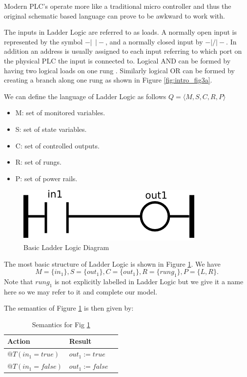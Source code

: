 Modern PLC's operate more like a traditional micro controller and thus the 
original schematic based language can prove to be awkward to work with.

The inputs in Ladder Logic are referred to as loads. A normally open input
is represented by the 
symbol $-\vert ~ ~ \vert-$, and a normally closed input by $-\vert/\vert-$.
In addition an address is usually assigned to each input referring to 
which port on the physical PLC the input is connected to. Logical AND 
can be formed by having two logical loads on one rung \cite{ebookmorris}. 
Similarly logical OR can be formed by creating a branch along one 
rung as shown in Figure \ref{fig:intro_fig3a}.

We can define the language of Ladder Logic as follows $Q = \langle M,S,C,R,P \rangle $

\begin{itemize}
	\item M: set of monitored variables.
	\item S: set of state variables.
	\item C: set of controlled outputs.
	\item R: set of rungs.
	\item P: set of power rails.
\end{itemize}

\begin{figure}[htp]
    \centering
    \includegraphics[width=\imgsmall]{./images/intro_fig1.png}
    \caption{Basic Ladder Logic Diagram}
    \label{fig:intro_fig1}
\end{figure}

The most basic structure of Ladder Logic is shown in Figure \ref{fig:intro_fig1}. 
We have 
$$M=\lbrace in_1 \rbrace, S=\lbrace out_1 \rbrace, C=\lbrace out_1 \rbrace, R=\lbrace rung_1 \rbrace, P=\lbrace L,R \rbrace.$$
Note that $rung_1$ is not explicitly labelled in Ladder Logic but we give it a name here
so we may refer to it and complete our model.

\clearpage
The semantics of Figure \ref{fig:intro_fig1} is then given by: 
\begin{table}[h]
    \centering
    \begin{tabular}{|l|l|l|}
        \hline
        Action & Result \\
        \hline
        $@T(in_1 = true)$ & $out_1 := true$ \\
        \hline
        $@T(in_1 = false)$ & $out_1 := false$ \\
        \hline
    \end{tabular}
    \caption{Semantics for Fig \ref{fig:intro_fig1}}
    \label{table:table_for_fig1}
\end{table}


